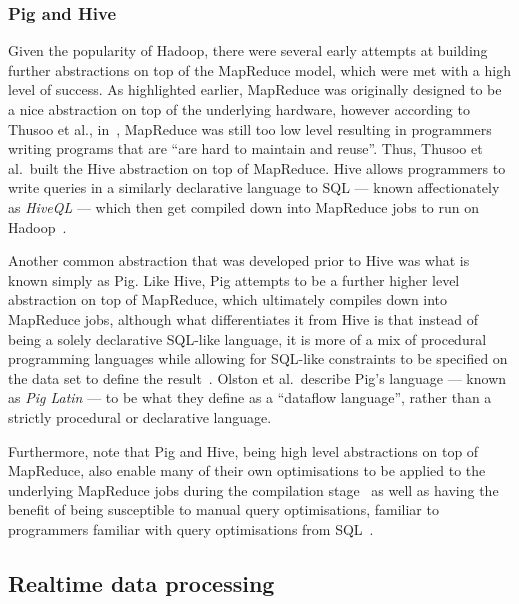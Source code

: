 \documentclass[a4paper,11pt]{article}
\begin{document}


\subsubsection{Pig and Hive} %
\label{ssub:pig_and_hive}

Given the popularity of Hadoop, there were several early attempts at building further abstractions on top of the
MapReduce model, which were met with a high level of success. As highlighted earlier, MapReduce was originally designed
to be a nice abstraction on top of the underlying hardware, however according to Thusoo et al., in~\cite{thusoo2009hive},
MapReduce was still too low level resulting in programmers writing programs that are ``are hard to maintain and reuse''.
Thus, Thusoo et al.\ built the Hive abstraction on top of MapReduce. Hive allows programmers to write queries in a
similarly declarative language to SQL --- known affectionately as \emph{HiveQL} --- which then get compiled down into
MapReduce jobs to run on Hadoop~\cite{thusoo2010hive}.

Another common abstraction that was developed prior to Hive was what is known simply as Pig. Like Hive, Pig attempts to
be a further higher level abstraction on top of MapReduce, which ultimately compiles down into MapReduce jobs, although
what differentiates it from Hive is that instead of being a solely declarative SQL-like language, it is more of a mix of
procedural programming languages while allowing for SQL-like constraints to be specified on the data set to define the
result~\cite{olston2008pig}. Olston et al.\ describe Pig's language --- known as \emph{Pig Latin} --- to be what they
define as a ``dataflow language'', rather than a strictly procedural or declarative language.

Furthermore, note that Pig and Hive, being high level abstractions on top of MapReduce, also enable many of their own
optimisations to be applied to the underlying MapReduce jobs during the compilation
stage~\cite{gates2009building,thusoo2010hive} as well as having the benefit of being susceptible to manual query
optimisations, familiar to programmers familiar with query optimisations from SQL~\cite{gruenheid2011query}.




\subsection{Realtime data processing} %
\label{sub:realtime_data_processing}
\end{document}
